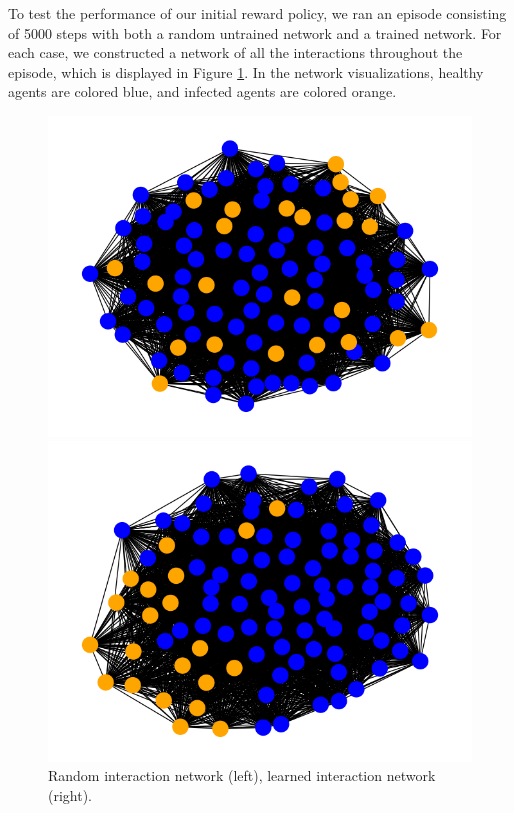 \documentclass[9pt]{IEEEtran}
\begin{document}
To test the performance of our initial reward policy, we ran an episode consisting of 5000 steps with both a random untrained network and a trained network. For each case, we constructed a network of all the interactions throughout the episode, which is displayed in Figure \ref{fig:nets_unfiltered}. In the network visualizations, healthy agents are colored blue, and infected agents are colored orange.

\begin{figure}[hbt]
    \centering
    \begin{minipage}{0.20\textwidth}
        \centering
        \includegraphics[width=\textwidth]{randomNet.png}
    \end{minipage}
    \begin{minipage}{0.25\textwidth}
        \centering
        \includegraphics[width=\textwidth]{learnedNet.png}
    \end{minipage}
    \caption{Random interaction network (left), learned interaction network (right).}
    \label{fig:nets_unfiltered}
\end{figure}
\end{document}
